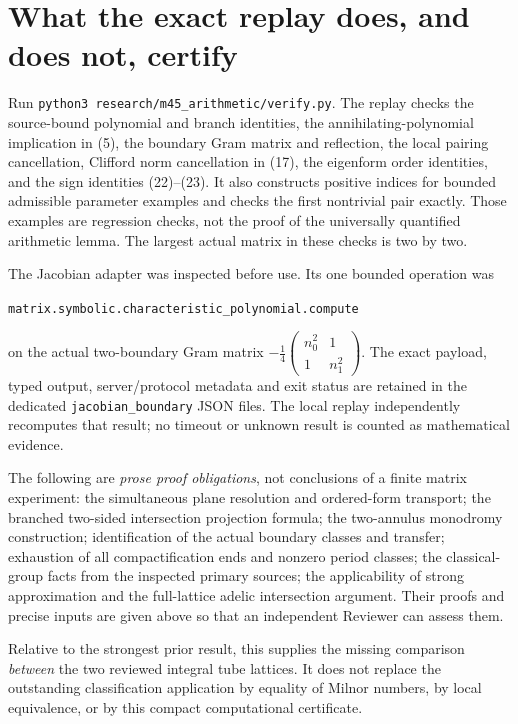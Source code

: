 \documentclass[11pt]{article}
\begin{document}
\section{What the exact replay does, and does not, certify}

Run \texttt{python3 research/m45\_arithmetic/verify.py}.
The replay checks the source-bound polynomial and branch identities,
the annihilating-polynomial implication in (5), the boundary Gram
matrix and reflection, the local pairing cancellation, Clifford
norm cancellation in (17), the eigenform order identities, and
the sign identities (22)--(23). It also constructs positive indices
for bounded admissible parameter examples and checks the first
nontrivial pair exactly. Those examples are regression checks,
not the proof of the universally quantified arithmetic lemma.
The largest actual matrix in these checks is two by two.

The Jacobian adapter was inspected before use. Its one bounded
operation was
\begin{center}
\small\texttt{matrix.symbolic.characteristic\_polynomial.compute}
\end{center}
on the actual two-boundary Gram matrix
\(-\tfrac14\left(\begin{smallmatrix}n_0^2&1\\1&n_1^2\end{smallmatrix}\right)\).
The exact payload, typed output, server/protocol metadata and exit
status are retained in the dedicated \texttt{jacobian\_boundary}
JSON files. The local replay independently recomputes that result;
no timeout or unknown result is counted as mathematical evidence.

The following are \emph{prose proof obligations}, not conclusions
of a finite matrix experiment: the simultaneous plane resolution
and ordered-form transport; the branched two-sided intersection
projection formula; the two-annulus monodromy construction;
identification of the actual boundary classes and transfer;
exhaustion of all compactification ends and nonzero period classes;
the classical-group facts from the inspected primary sources;
the applicability of strong approximation and the full-lattice
adelic intersection argument. Their proofs and precise inputs
are given above so that an independent Reviewer can assess them.

Relative to the strongest prior result, this supplies the missing
comparison \emph{between} the two reviewed integral tube lattices.
It does not replace the outstanding classification application
by equality of Milnor numbers, by local equivalence, or by this
compact computational certificate.
\end{document}
